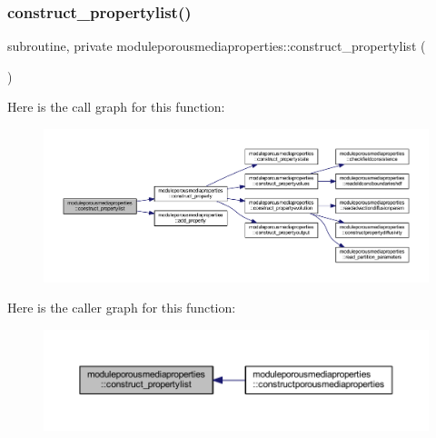 \subsubsection{\texorpdfstring{construct\+\_\+propertylist()}{construct\_propertylist()}}
{\footnotesize\ttfamily subroutine, private moduleporousmediaproperties\+::construct\+\_\+propertylist (\begin{DoxyParamCaption}{ }\end{DoxyParamCaption})\hspace{0.3cm}{\ttfamily [private]}}

Here is the call graph for this function\+:\nopagebreak
\begin{figure}[H]
\begin{center}
\leavevmode
\includegraphics[width=350pt]{namespacemoduleporousmediaproperties_a0b617f6e3c622010d4230970529e87fb_cgraph}
\end{center}
\end{figure}
Here is the caller graph for this function\+:\nopagebreak
\begin{figure}[H]
\begin{center}
\leavevmode
\includegraphics[width=350pt]{namespacemoduleporousmediaproperties_a0b617f6e3c622010d4230970529e87fb_icgraph}
\end{center}
\end{figure}
\mbox{\label{namespacemoduleporousmediaproperties_acd8b0a3775ea88f8c55b0a2d1eaa957f}} 
